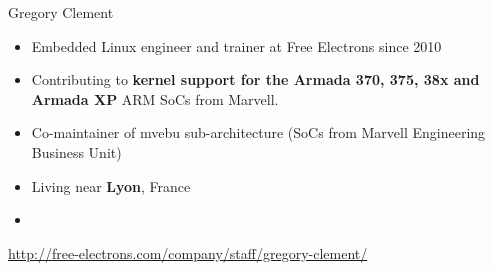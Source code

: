 \begin{frame}{Gregory Clement}
    \begin{itemize}
	\item Embedded Linux engineer and trainer at Free Electrons since 2010
  	\item Contributing to {\bf kernel support for the Armada 370, 375, 38x and
      	      Armada XP} ARM SoCs from Marvell.
  	\item Co-maintainer of mvebu sub-architecture (SoCs from Marvell
    	      Engineering Business Unit)
  	\item Living near {\bf Lyon}, France
    	\item {}
    \end{itemize}
    {\small \url{http://free-electrons.com/company/staff/gregory-clement/}}
\end{frame}

